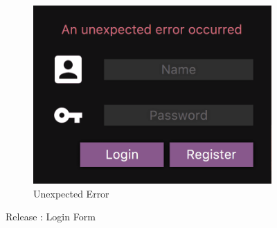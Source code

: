 \documentclass[12pt, titlepage]{scrartcl}
\newcommand{\RN}[1]{%
	\textup{\uppercase\expandafter{\romannumeral#1}}%
}
\begin{document}
\begin{figure}[H]
\begin{subfigure}[h]{0.3\linewidth}
                        \includegraphics[width=\linewidth]{images/old_state/login/UnexpectedError.png}
                        \caption{Unexpected Error}
                    \end{subfigure}
                    \caption{Release \RN{2}: Login Form}
                    \label{Login_Form}
                \end{figure}
\end{document}
